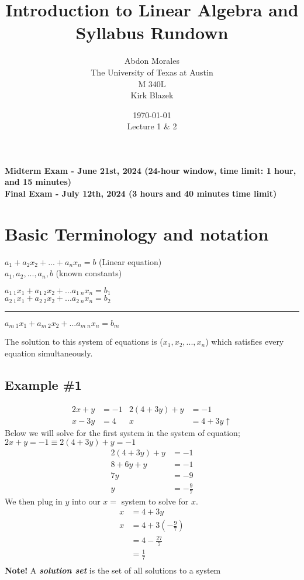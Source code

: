 \documentclass[11pt]{article} %
\title{Introduction to Linear Algebra and Syllabus Rundown}
\author{Abdon Morales \\ The University of Texas at Austin \\ M 340L \\ Kirk Blazek}
\date{\today \\ Lecture 1 \& 2}
\begin{document}
\maketitle
\begin{tcolorbox}[width=\textwidth,colback={white},title={Important Dates for the course!!!},colbacktitle=yellow,coltitle=blue]
\begin{center}
\textbf{Midterm Exam - June 21st, 2024 (24-hour window, time limit: 1 hour, and 15 minutes)} \\
\textbf{Final Exam - July 12th, 2024 (3 hours and 40 minutes time limit)}
\end{center}
\end{tcolorbox}
\section*{Basic Terminology and notation}
$a_1 + a_2 x_2 + ... + a_n x_n = b$ (Linear equation) \\
$a_1, a_2, ..., a_n, b$ (known constants) \\
\begin{tcolorbox}[width=\textwidth,colback={white},title={System of linear equations},colbacktitle=yellow,coltitle=blue]
\begin{center}
$a_{1\;1} x_1 + a_{1\;2} x_2 + ... a_{1\;n} x_n = b_1$ \\
$a_{2\;1} x_1 + a_{2\;2} x_2 + ... a_{2\;n} x_n = b_2$ \\
\hrule
$a_{m\;1} x_1 + a_{m\;2} x_2 + ... a_{m\;n} x_n = b_m$
\end{center}
The solution to this system of equations is ($x_1, x_2, ..., x_n$) which satisfies every equation simultaneously.
\end{tcolorbox}

\subsection*{Example \#1}
\begin{align*}
2x + y &= -1 & 2(4 + 3y) + y &= -1 \\
x - 3y &= 4 & x &= 4 + 3y \uparrow
\end{align*}
Below we will solve for the first system in the system of equation; $2x + y = -1 \equiv 2(4 + 3y) + y = -1$
\begin{align*}
2(4 + 3y) + y &= -1 \\
8 + 6y + y &= -1 \\
7y &= -9 \\
y &= - \frac{9}{7}
\end{align*}
We then plug in $y$ into our $x=$ system to solve for $x$.
\begin{align*}
x &= 4 + 3y \\
x &= 4 + 3(-\frac{9}{7}) \\
&= 4 - \frac{27}{7} \\
&= \frac{1}{7} \\
\end{align*}
\textbf{Note!} A \textbf{\textit{solution set}} is the set of all solutions to a system
\end{document}
